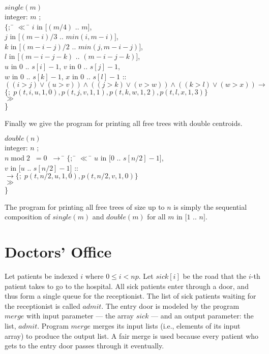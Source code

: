 \begin{tabbing}
$single(m)$ \\
integer: $m$ ; \\
$\{;$ \=
$\ll$      \= $i$ in $[(m/4)$ .. $m]$, \\
        \>   \> $j$ in $[(m-i)/3$ .. $min(i,m-i)]$,\\
         \>  \> $k$ in [$(m-i-j)/2$ .. $min(j,m-i-j)]$, \\
         \>  \> $l$ in [$(m-i-j-k)$ .. $(m-i-j-k)]$, \\
         $u$ in 0 .. $s[i]-1$,
         $v$ in 0 .. $s[j]-1$,\\
         $w$ in 0 .. $s[k]-1$,
         $x$ in 0 .. $s[l]-1$ :: \\
$((i > j) \vee (u > v)) \wedge ((j > k) \vee (v > w )) \wedge 
((k > l) \vee (w > x ))
\rightarrow $ \\
$\{ ; \;  p(t,i,u,1,0),p(t,j,v,1,1),p(t,k,w,1,2),p(t,l,x,1,3)\}$ \\
\> $\gg$  \\
\}
\end{tabbing}

Finally we give the program for printing all free trees with double
centroids.
\begin{tabbing}
$double(n)$ \\
integer: $n$ ; \\
$n \; $mod$ \; 2 \; \; = 0 \; \; \rightarrow$
\= $\{;$ 
\= $\ll$      \=  $u$ in $[0$ ..  $s[n/2] - 1]$, \\
    \>    \>    \> $v$ in $[u$ .. $s[n/2] - 1]$ :: \\
\> \> \> $ \rightarrow \{ ; \;  p(t,n/2,u,1,0),p(t,n/2,v,1,0) \}$ \\
\> \> $\gg$  \\
\> \}
\end{tabbing}
The program for printing all free trees of size up to $n$ is simply
the sequential composition of $single(m)$ and $double(m)$ for all
$m$ in $[1$ .. $n]$.


\section{Doctors' Office}
Let patients be indexed $i$ where $0 \leq i < np$.
Let $sick[i]$ be the road that the $i$-th patient takes to go to the
hospital.
All sick patients enter through a door, and thus form a single queue
for the receptionist.
The list of sick patients waiting for the receptionist
is called $admit$.
The entry door is modeled by the program $merge$ with 
input parameter --- the array $sick$ --- and
an output parameter: the list, $admit$.
Program $merge$ merges its input lists (i.e., elements of its input array)
to produce the output list.
A fair merge is used because every patient who gets to the entry door
passes through it eventually.

